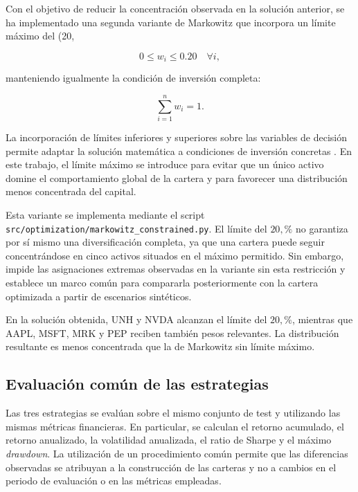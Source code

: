 Con el objetivo de reducir la concentración observada en la solución anterior, se ha implementado una segunda variante de Markowitz que incorpora un límite máximo del (20,%

\begin{equation}
0 \leq w_i \leq 0.20 \quad \forall i,
\end{equation}

manteniendo igualmente la condición de inversión completa:

\begin{equation}
\sum_{i=1}^{n} w_i = 1.
\end{equation}

La incorporación de límites inferiores y superiores sobre las variables de decisión permite adaptar la solución matemática a condiciones de inversión concretas \cite{boyd2004convex}. En este trabajo, el límite máximo se introduce para evitar que un único activo domine el comportamiento global de la cartera y para favorecer una distribución menos concentrada del capital.

Esta variante se implementa mediante el script \texttt{src/optimization/markowitz\_constrained.py}. El límite del \(20, \%\) no garantiza por sí mismo una diversificación completa, ya que una cartera puede seguir concentrándose en cinco activos situados en el máximo permitido. Sin embargo, impide las asignaciones extremas observadas en la variante sin esta restricción y establece un marco común para compararla posteriormente con la cartera optimizada a partir de escenarios sintéticos.

En la solución obtenida, UNH y NVDA alcanzan el límite del \(20,\%\), mientras que AAPL, MSFT, MRK y PEP reciben también pesos relevantes. La distribución resultante es menos concentrada que la de Markowitz sin límite máximo.

\subsection{Evaluación común de las estrategias}

Las tres estrategias se evalúan sobre el mismo conjunto de test y utilizando las mismas métricas financieras. En particular, se calculan el retorno acumulado, el retorno anualizado, la volatilidad anualizada, el ratio de Sharpe y el máximo \textit{drawdown}. La utilización de un procedimiento común permite que las diferencias observadas se atribuyan a la construcción de las carteras y no a cambios en el periodo de evaluación o en las métricas empleadas.

